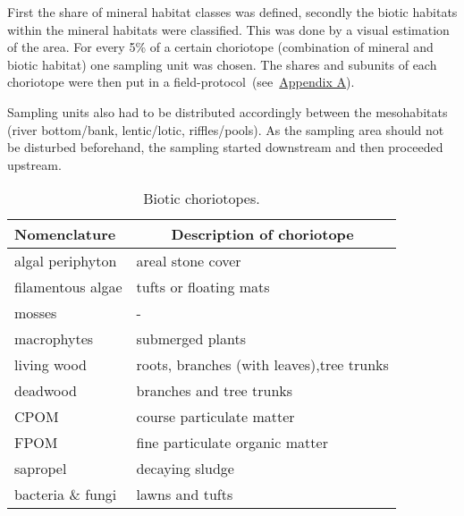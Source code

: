 First the share of mineral habitat classes was defined, secondly the biotic habitats within the mineral habitats were classified. This was done by a visual estimation of the area. For every 5\% of a certain choriotope (combination of mineral and biotic habitat) one sampling unit was chosen. The shares and subunits of each choriotope were then put in a field-protocol~(see~\hyperref[appendixA]{Appendix A}).

Sampling units also had to be distributed accordingly between the mesohabitats (river bottom/bank, lentic/lotic, riffles/pools). As the sampling area should not be disturbed beforehand, the sampling started downstream and then proceeded upstream.





\begin{table}[!htb]                                 %
  \centering
  \small                                                       %
  \caption{Biotic choriotopes.}
    \begin{tabular}{ l l }
  \toprule
    Nomenclature  &
    \multicolumn{1}{c}{Description of choriotope} \\
  \hline
  \hline
    algal periphyton    & areal stone cover\\
    filamentous algae   & tufts or floating mats\\
    mosses              & -\\
    macrophytes         & submerged plants\\
    living wood         & roots, branches (with leaves),\newline tree trunks\\
    deadwood            & branches and tree trunks\\
    CPOM                & course particulate matter\\
    FPOM                & fine particulate organic matter\\
    sapropel            & decaying sludge\\
    bacteria \& fungi   & lawns and tufts\\
  \bottomrule
    \end{tabular}
  \label{tab:choriotope_biotic}%
\end{table}%










